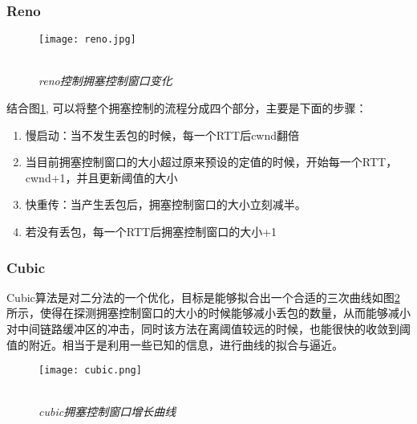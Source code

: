 \documentclass[a4paper, 12pt, UTF8]{ctexart}
\begin{document}
\subsubsection{Reno}
\begin{figure}[H]
	\centering \texttt{[image: reno.jpg]}
	\\ \hspace*{\fill} \\
	\caption{\em reno控制拥塞控制窗口变化}
	\label{fig:reno algorithm}
\end{figure}
\par 结合图\ref{fig:reno algorithm}, 可以将整个拥塞控制的流程分成四个部分，主要是下面的步骤：
\begin{enumerate}
	\item 慢启动：当不发生丢包的时候，每一个RTT后cwnd翻倍
	\item 当目前拥塞控制窗口的大小超过原来预设的定值的时候，开始每一个RTT，cwnd+1，并且更新阈值的大小
	\item 快重传：当产生丢包后，拥塞控制窗口的大小立刻减半。
	\item 若没有丢包，每一个RTT后拥塞控制窗口的大小+1
\end{enumerate}


\subsubsection{Cubic}
\par Cubic算法\cite{10.1145/1400097.1400105}是对二分法的一个优化，目标是能够拟合出一个合适的三次曲线如图\ref{fig:cubics algorithm}所示，使得在探测拥塞控制窗口的大小的时候能够减小丢包的数量，从而能够减小对中间链路缓冲区的冲击，同时该方法在离阈值较远的时候，也能很快的收敛到阈值的附近。相当于是利用一些已知的信息，进行曲线的拟合与逼近。

\begin{figure}[H]
	\centering \texttt{[image: cubic.png]}
	\\ \hspace*{\fill} \\
	\caption{\em cubic拥塞控制窗口增长曲线}
	\label{fig:cubics algorithm}
\end{figure}
\end{document}
